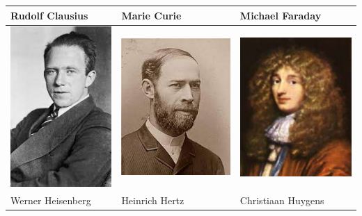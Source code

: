 \documentclass[a4paper]{scrartcl}
\begin{document}
\begin{aufgabe}[points={6}]
\begin{longtable}{|>{\centering\arraybackslash}p{4.2cm}|>{\centering\arraybackslash}p{4.2cm}|>{\centering\arraybackslash}p{4.2cm}|}
	\hline 
	Rudolf Clausius & Marie Curie & Michael Faraday \\ 
	\hline 
\includegraphics[scale=0.5]{Heisenberg.jpg} & \includegraphics[scale=0.5]{Hertz.jpg} & \includegraphics[scale=0.5]{Huygens.jpg} \\
	\hline 
	Werner Heisenberg & Heinrich Hertz & Christiaan Huygens \\ 
	\hline 

\end{longtable}
\end{aufgabe}
\end{document}
